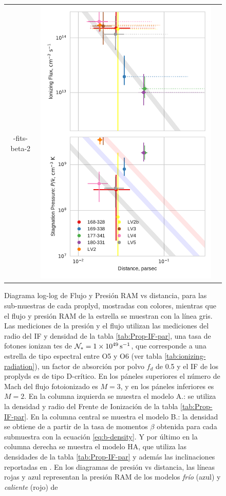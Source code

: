 \begin{figure}
\begin{tabular}{ccc}
-fits-beta-2} & \includegraphics[width=0.3\linewidth]{./Figures/plot-wind-fits-HA98-2}
  \end{tabular}
  \caption{Diagrama log-log de Flujo y Presión RAM vs distancia, para las sub-muestras de cada proplyd, mostradas con colores, mientras que el flujo y presión RAM de la estrella se muestran con la línea gris. Las mediciones de la presión y el flujo utilizan las mediciones del radio del IF y densidad de la tabla \ref{tab:Prop-IF-par}, una tasa de fotones ionizan
    tes de $\mathcal{N}_* = \SI{1e49}{s^{-1}}$, que corresponde a una estrella de tipo espectral entre O5 y O6 (ver tabla \ref{tab:ionizing-radiation}), un factor de absorción por polvo  $f_d$ de 0.5 y el IF de los proplyds es de tipo D-crítico. En los páneles superiores el número de Mach del flujo fotoionizado es $M=3$, y en los páneles inferiores es $M=2$. En la columna izquierda se muestra el modelo A.: se utiliza la densidad y radio del Frente de Ionización de la tabla \ref{tab:Prop-IF-par}. En la columna central se muestra el modelo B.: la densidad se obtiene de a partir de la tasa de momentos $\beta$ obtenida para cada submuestra con la ecuación \ref{eq:b-density}. Y por último en la columna derecha se muestra el modelo HA, que utiliza las densidades de la tabla \ref{tab:Prop-IF-par} y además las inclinaciones reportadas en \citet{HA:1998}. En los diagramas de presión vs distancia, las líneas rojas y azul representan la presión RAM de los modelos \textit{frío} (azul) y \textit{caliente} (rojo) de \citet{Gagne:2005}}
  \label{fig:wind-fits}
\end{figure}

